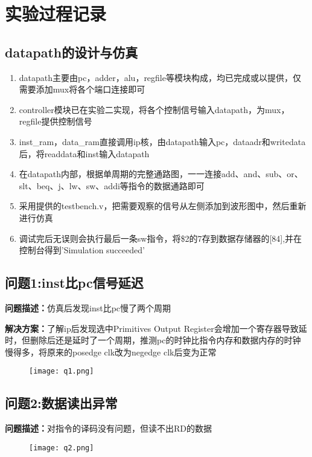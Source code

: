 \section{实验过程记录}

\subsection{datapath的设计与仿真}
\begin{enumerate}
    \item datapath主要由pc，adder，alu，regfile等模块构成，均已完成或以提供，仅需要添加mux将各个端口连接即可
    \item controller模块已在实验二实现，将各个控制信号输入datapath，为mux，regfile提供控制信号
    \item inst\_ram，data\_ram直接调用ip核，由datapath输入pc，dataadr和writedata后，将readdata和inst输入datapath
    \item 在datapath内部，根据单周期的完整通路图，一一连接add、and、sub、or、slt、beq、j、lw、sw、addi等指令的数据通路即可
    \item 采用提供的testbench.v，把需要观察的信号从左侧添加到波形图中，然后重新进行仿真
    \item 调试完后无误则会执行最后一条sw指令，将\$2的7存到数据存储器的[84],并在控制台得到'Simulation succeeded'
\end{enumerate}


\subsection{问题1:inst比pc信号延迟}
\textbf{问题描述：}仿真后发现inst比pc慢了两个周期

\textbf{解决方案：}了解ip后发现选中Primitives Output Register会增加一个寄存器导致延时，但删除后还是延时了一个周期，推测pc的时钟比指令内存和数据内存的时钟慢得多，将原来的posedge clk改为negedge clk后变为正常
\begin{figure}[htbp]
    \centering
    \texttt{[image: q1.png]}
    \label{图1}
\end{figure}

\subsection{问题2:数据读出异常}
\textbf{问题描述：}对指令的译码没有问题，但读不出RD的数据
\begin{figure}[htbp]
    \centering
    \texttt{[image: q2.png]}
    \label{图2}
\end{figure}

